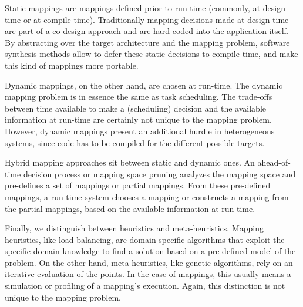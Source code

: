 Static mappings are mappings defined prior to run-time (commonly, at design-time or at compile-time).
Traditionally mapping decisions made at design-time are part of a co-design approach and are hard-coded into the application itself.
By abstracting over the target architecture and the mapping problem, software synthesis methods allow to defer these static decisions to compile-time, and make this kind of mappings more portable.

Dynamic mappings, on the other hand, are chosen at run-time.
The dynamic mapping problem is in essence the same as task scheduling.
The trade-offs between time available to make a (scheduling) decision and the available information at run-time are certainly not unique to the mapping problem.
However, dynamic mappings present an additional hurdle in heterogeneous systems, since code has to be compiled for the different possible targets.

Hybrid mapping approaches sit between static and dynamic ones. An ahead-of-time decision process or mapping space pruning analyzes the mapping space and pre-defines a set of mappings or partial mappings.
From these pre-defined mappings, a run-time system chooses a mapping or constructs a mapping from the partial mappings, based on the available information at run-time.

Finally, we distinguish between heuristics and meta-heuristics.
Mapping heuristics, like load-balancing, are domain-specific algorithms that exploit the specific domain-knowledge to find a solution based on a pre-defined model of the problem.
On the other hand, meta-heuristics, like genetic algorithms, rely on an iterative evaluation of the points.
In the case of mappings, this usually means a simulation or profiling of a mapping's execution.
Again, this distinction is not unique to the mapping problem.